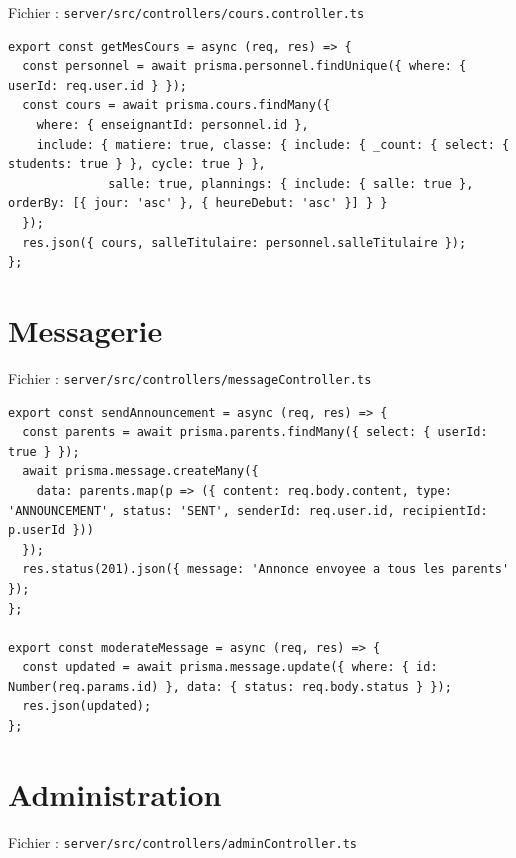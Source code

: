 \documentclass[12pt,a4paper]{article}
\begin{document}
Fichier : \texttt{server/src/controllers/cours.controller.ts}

\begin{lstlisting}[style=code]
export const getMesCours = async (req, res) => {
  const personnel = await prisma.personnel.findUnique({ where: { userId: req.user.id } });
  const cours = await prisma.cours.findMany({
    where: { enseignantId: personnel.id },
    include: { matiere: true, classe: { include: { _count: { select: { students: true } }, cycle: true } },
              salle: true, plannings: { include: { salle: true }, orderBy: [{ jour: 'asc' }, { heureDebut: 'asc' }] } }
  });
  res.json({ cours, salleTitulaire: personnel.salleTitulaire });
};
\end{lstlisting}

\newpage

\section{Messagerie}

Fichier : \texttt{server/src/controllers/messageController.ts}

\begin{lstlisting}[style=code]
export const sendAnnouncement = async (req, res) => {
  const parents = await prisma.parents.findMany({ select: { userId: true } });
  await prisma.message.createMany({
    data: parents.map(p => ({ content: req.body.content, type: 'ANNOUNCEMENT', status: 'SENT', senderId: req.user.id, recipientId: p.userId }))
  });
  res.status(201).json({ message: 'Annonce envoyee a tous les parents' });
};

export const moderateMessage = async (req, res) => {
  const updated = await prisma.message.update({ where: { id: Number(req.params.id) }, data: { status: req.body.status } });
  res.json(updated);
};
\end{lstlisting}

\newpage

\section{Administration}

Fichier : \texttt{server/src/controllers/adminController.ts}
\end{document}
